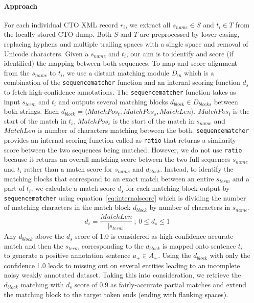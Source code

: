 \documentclass[letterpaper]{article} %
\begin{document}
\paragraph{Approach}
For each individual CTO XML record $r_i$, we extract all $s_{name} \in S$ and $t_i \in T$ from the locally stored CTO dump.
Both $S$ and $T$ are preprocessed by lower-casing, replacing hyphens and multiple trailing spaces with a single space and removal of Unicode characters.
Given a $s_{name}$ and $t_i$, our aim is to identify and score (if identified) the mapping between both sequences.
To map and score alignment from the $s_{name}$ to $t_i$, we use a distant matching module $D_m$ which is a combination of the {\tt sequencematcher} function and an internal scoring function $d_s$ to fetch high-confidence annotations.
The {\tt sequencematcher} function takes as input $s_{term}$ and $t_i$ and outputs several matching blocks $d_{block} \in D_{blocks}$ between both strings.
Each $d_{block} = \langle MatchPos_{t}, MatchPos_{s}, MatchLen \rangle $. 
$MatchPos_{t}$ is the start of the match in $t_i$, $MatchPos_{s}$ is the start of the match in $s_{name}$ and $MatchLen$ is number of characters matching between the both.
{\tt sequencematcher} provides an internal scoring function called as {\tt ratio} that returns a similarity score between the two sequences being matched.
However, we do not use {\tt ratio} because it returns an overall matching score between the two full sequences $s_{name}$ and $t_i$ rather than a match score for $s_{name}$ and $d_{block}$.
Instead, to identify the matching blocks that correspond to an exact match between an entire $s_{term}$ and a part of $t_i$, we calculate a match score $d_s$ for each matching block output by {\tt sequencematcher} using equation~\ref{eq:internalscore} which is dividing the number of matching characters in the match block $d_{block}$ by number of characters in $s_{name}$.
%
\begin{gather}
\label{eq:internalscore}
  d_s = \dfrac{ MatchLen }{ |s_{term}| } \: ; \: 0 \leq d_s \leq 1
\end{gather}
%
Any $d_{block}$ above the $d_s$ score of 1.0 is considered as high-confidence accurate match and then the $s_{term}$ corresponding to the $d_{block}$ is mapped onto sentence $t_i$ to generate a positive annotation sentence $a_{+} \in A_{+}$.
Using the $d_{block}$ with only the confidence 1.0 leads to missing out on several entities leading to an incomplete noisy weakly annotated dataset.
Taking this into consideration, we retrieve the $d_{block}$ matching with $d_s$ score of 0.9 as fairly-accurate partial matches and extend the matching block to the target token ends (ending with flanking spaces).
\end{document}
